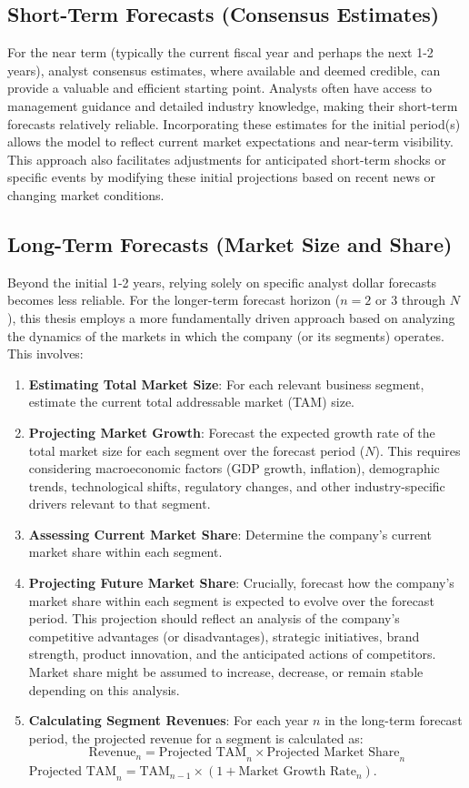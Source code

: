 \subsection{Short-Term Forecasts (Consensus Estimates)}
For the near term (typically the current fiscal year and perhaps the next 1-2 years), analyst consensus estimates, where available and deemed credible, can provide a valuable and efficient starting point. Analysts often have access to management guidance and detailed industry knowledge, making their short-term forecasts relatively reliable. Incorporating these estimates for the initial period(s) allows the model to reflect current market expectations and near-term visibility. This approach also facilitates adjustments for anticipated short-term shocks or specific events by modifying these initial projections based on recent news or changing market conditions.

\subsection{Long-Term Forecasts (Market Size and Share)}
Beyond the initial 1-2 years, relying solely on specific analyst dollar forecasts becomes less reliable. For the longer-term forecast horizon (\(n=2 \text{ or } 3\) through \(N\)), this thesis employs a more fundamentally driven approach based on analyzing the dynamics of the markets in which the company (or its segments) operates. This involves:

\begin{enumerate}
    \item \textbf{Estimating Total Market Size}: For each relevant business segment, estimate the current total addressable market (TAM) size.
    \item \textbf{Projecting Market Growth}: Forecast the expected growth rate of the total market size for each segment over the forecast period (\(N\)). This requires considering macroeconomic factors (GDP growth, inflation), demographic trends, technological shifts, regulatory changes, and other industry-specific drivers relevant to that segment.
    \item \textbf{Assessing Current Market Share}: Determine the company's current market share within each segment.
    \item \textbf{Projecting Future Market Share}: Crucially, forecast how the company's market share within each segment is expected to evolve over the forecast period. This projection should reflect an analysis of the company's competitive advantages (or disadvantages), strategic initiatives, brand strength, product innovation, and the anticipated actions of competitors. Market share might be assumed to increase, decrease, or remain stable depending on this analysis.
    \item \textbf{Calculating Segment Revenues}: For each year \(n\) in the long-term forecast period, the projected revenue for a segment is calculated as:
          \[ \text{Revenue}_{n} = \text{Projected TAM}_{n} \times \text{Projected Market Share}_{n} \]
          \(\text{Projected TAM}_{n} = \text{TAM}_{n-1} \times (1 + \text{Market Growth Rate}_{n})\).
\end{enumerate}

